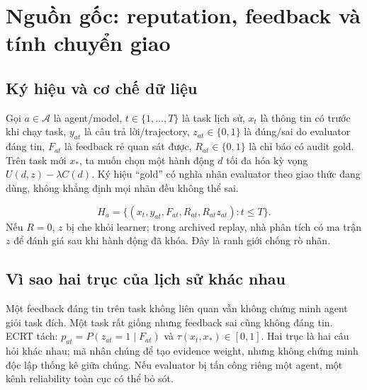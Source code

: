 \documentclass[11pt,a4paper,openany]{book}
\begin{document}
\chapter{Nguồn gốc: reputation, feedback và tính chuyển giao}
\section{Ký hiệu và cơ chế dữ liệu}
Gọi \(a\in\mathcal A\) là agent/model, \(t\in\{1,\ldots,T\}\) là task lịch sử, \(x_t\) là thông tin có trước khi chạy task, \(y_{at}\) là câu trả lời/trajectory, \(z_{at}\in\{0,1\}\) là đúng/sai do evaluator đáng tin, \(F_{at}\) là feedback rẻ quan sát được, \(R_{at}\in\{0,1\}\) là chỉ báo có audit gold. Trên task mới \(x_*\), ta muốn chọn một hành động \(d\) tối đa hóa kỳ vọng \(U(d,z)-\lambda C(d)\). Ký hiệu ``gold'' có nghĩa nhãn evaluator theo giao thức đang dùng, không khẳng định mọi nhãn đều không thể sai.

\begin{equation}\label{eq:history}H_a=\{(x_t,y_{at},F_{at},R_{at},R_{at}z_{at}):t\le T\}.
\end{equation}
Nếu \(R=0\), \(z\) bị che khỏi learner; trong archived replay, nhà phân tích có ma trận \(z\) để đánh giá sau khi hành động đã khóa. Đây là ranh giới chống rò nhãn.

\section{Vì sao hai trục của lịch sử khác nhau}
Một feedback đáng tin trên task không liên quan vẫn không chứng minh agent giỏi task đích. Một task rất giống nhưng feedback sai cũng không đáng tin. ECRT tách: \(p_{at}=P(z_{at}=1\mid F_{at})\) và \(\tau(x_t,x_*)\in[0,1]\). Hai trục là hai câu hỏi khác nhau; mã nhân chúng để tạo evidence weight, nhưng không chứng minh độc lập thống kê giữa chúng. Nếu evaluator bị tấn công riêng một agent, một kênh reliability toàn cục có thể bỏ sót.
\end{document}
